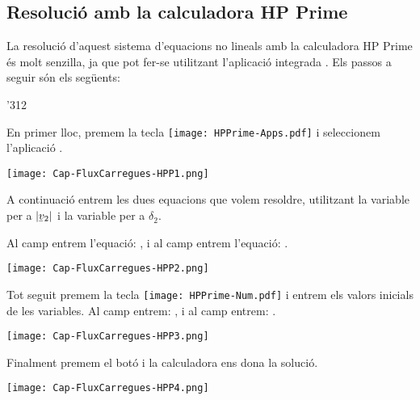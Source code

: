 \hspace{1cm}

\hspace{1cm}

\hspace{1cm}

\subsection{Resolució amb la calculadora \textsf{HP Prime}}

La resolució d'aquest sistema d'equacions no lineals amb la calculadora \textsf{HP Prime} és molt senzilla, ja que pot fer-se utilitzant l'aplicació integrada . Els passos a seguir són els següents:

\begin{dingautolist}{'312}

    \item En primer lloc, premem la tecla \texttt{[image: HPPrime-Apps.pdf]} i seleccionem l'aplicació .

         \texttt{[image: Cap-FluxCarregues-HPP1.png]}

    \item A continuació entrem les dues equacions que volem resoldre, utilitzant la variable  per a $|\cmplx{v}_2|$ i la variable  per a $\delta_2$.

        Al camp  entrem l'equació: , i al camp  entrem l'equació: .

        \texttt{[image: Cap-FluxCarregues-HPP2.png]}

    \item Tot seguit premem la tecla \texttt{[image: HPPrime-Num.pdf]} i entrem els valors inicials de les variables. Al camp  entrem: , i al camp  entrem: .

        \texttt{[image: Cap-FluxCarregues-HPP3.png]}

    \item  Finalment premem el botó  i la calculadora ens dona  la solució.

        \texttt{[image: Cap-FluxCarregues-HPP4.png]}

\end{dingautolist}
